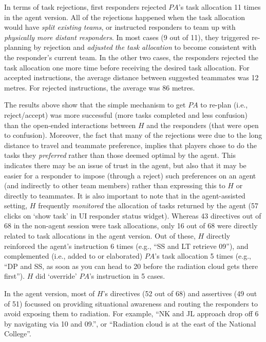 In terms of task rejections, first responders rejected $PA$'s task allocation 11 times in the agent version. All of the rejections happened when the task allocation would have \emph{split existing teams}, or instructed responders to team up with \emph{physically more distant responders}. In most cases (9 out of 11), they triggered re-planning by rejection and \emph{adjusted the task allocation} to become consistent with the responder's current team. In the other two cases, the responders rejected  the task allocation one more time before receiving the desired task allocation. For accepted instructions, the average distance between suggested teammates was 12 metres. For rejected instructions, the average was 86 metres.

The results above show that  the simple mechanism to get $PA$ to re-plan (i.e., reject/accept) was more successful (more tasks completed and less confusion) than the open-ended interactions between $H$ and the responders (that were open to confusion).  Moreover, the fact that many of the rejections were due to the long distance to travel and teammate preference, implies that players chose to do the tasks they \emph{preferred}  rather than those deemed optimal by the agent. This indicates there may be an issue of trust in the agent, but also that it may be easier for a responder  to impose (through a reject) such preferences on an agent (and indirectly to other team members) rather than expressing this to $H$ or directly to teammates. 
It is also important to note that in the agent-assisted setting, $H$ frequently \emph{monitored} the allocation of tasks  returned by the agent (57 clicks on `show task' in UI responder status widget). Whereas 43 directives out of 68 in the non-agent session were task allocations, only 16 out of 68 were directly related to task allocations in the agent version. Out of these, $H$ directly reinforced the agent's instruction 6 times (e.g., ``SS and LT retrieve 09''), and complemented (i.e., added to or elaborated) $PA$'s task allocation 5 times (e.g., ``DP and SS, as soon as you can head to 20 before the radiation cloud gets there first''). $H$  did `override' $PA$'s instruction in 5 cases.  

In the agent version, most of $H$'s directives (52 out of 68) and assertives (49 out of 51) focussed on providing situational awareness and  routing the responders to avoid exposing them to radiation. For example, ``NK and JL approach drop off 6 by navigating via 10 and 09.'', or ``Radiation cloud is at the east of the National College''. 


